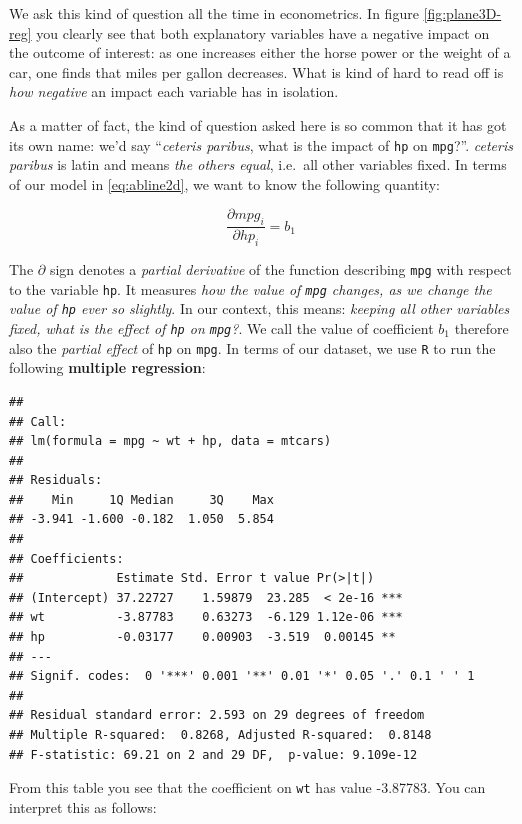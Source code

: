 \documentclass[]{book}
\begin{document}
 We ask this kind of question all the time in econometrics. In figure
\ref{fig:plane3D-reg} you clearly see that both explanatory variables
have a negative impact on the outcome of interest: as one increases
either the horse power or the weight of a car, one finds that miles per
gallon decreases. What is kind of hard to read off is \emph{how
negative} an impact each variable has in isolation.

As a matter of fact, the kind of question asked here is so common that
it has got its own name: we'd say ``\emph{ceteris paribus}, what is the
impact of \texttt{hp} on \texttt{mpg}?''. \emph{ceteris paribus} is
latin and means \emph{the others equal}, i.e.~all other variables fixed.
In terms of our model in \eqref{eq:abline2d}, we want to know the
following quantity:

\begin{equation}
\frac{\partial mpg_i}{\partial hp_i} = b_1 \label{eq:abline2d-deriv}
\end{equation}

The \(\partial\) sign denotes a \emph{partial derivative} of the
function describing \texttt{mpg} with respect to the variable
\texttt{hp}. It measures \emph{how the value of \texttt{mpg} changes, as
we change the value of \texttt{hp} ever so slightly}. In our context,
this means: \emph{keeping all other variables fixed, what is the effect
of \texttt{hp} on \texttt{mpg}?}. We call the value of coefficient
\(b_1\) therefore also the \emph{partial effect} of \texttt{hp} on
\texttt{mpg}. In terms of our dataset, we use \texttt{R} to run the
following \textbf{multiple regression}:

\begin{verbatim}
## 
## Call:
## lm(formula = mpg ~ wt + hp, data = mtcars)
## 
## Residuals:
##    Min     1Q Median     3Q    Max 
## -3.941 -1.600 -0.182  1.050  5.854 
## 
## Coefficients:
##             Estimate Std. Error t value Pr(>|t|)    
## (Intercept) 37.22727    1.59879  23.285  < 2e-16 ***
## wt          -3.87783    0.63273  -6.129 1.12e-06 ***
## hp          -0.03177    0.00903  -3.519  0.00145 ** 
## ---
## Signif. codes:  0 '***' 0.001 '**' 0.01 '*' 0.05 '.' 0.1 ' ' 1
## 
## Residual standard error: 2.593 on 29 degrees of freedom
## Multiple R-squared:  0.8268, Adjusted R-squared:  0.8148 
## F-statistic: 69.21 on 2 and 29 DF,  p-value: 9.109e-12
\end{verbatim}

From this table you see that the coefficient on \texttt{wt} has value
-3.87783. You can interpret this as follows:
\end{document}
